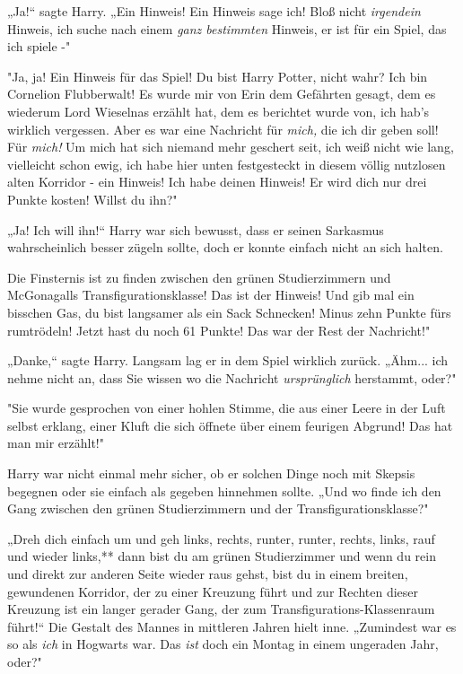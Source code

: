 {„Ja!“ sagte Harry. „Ein Hinweis! Ein Hinweis sage ich! Bloß nicht \emph{irgendein} Hinweis, ich suche nach einem \emph{ganz bestimmten} Hinweis, er ist für ein Spiel, das ich spiele -"

"Ja, ja! Ein Hinweis für das Spiel! Du bist Harry Potter, nicht wahr? Ich bin Cornelion Flubberwalt! Es wurde mir von Erin dem Gefährten gesagt, dem es wiederum Lord Wieselnas erzählt hat, dem es berichtet wurde von, ich hab's wirklich vergessen. Aber es war eine Nachricht für \emph{mich,} die ich dir geben soll! Für \emph{mich!} Um mich hat sich niemand mehr geschert seit, ich weiß nicht wie lang, vielleicht schon ewig, ich habe hier unten festgesteckt in diesem völlig nutzlosen alten Korridor - ein Hinweis! Ich habe deinen Hinweis! Er wird dich nur drei Punkte kosten! Willst du ihn?"

„Ja! Ich will ihn!“ Harry war sich bewusst, dass er seinen Sarkasmus wahrscheinlich besser zügeln sollte, doch er konnte einfach nicht an sich halten.

Die Finsternis ist zu finden zwischen den grünen Studierzimmern und McGonagalls Transfigurationsklasse! Das ist der Hinweis! Und gib mal ein bisschen Gas, du bist langsamer als ein Sack Schnecken! Minus zehn Punkte fürs rumtrödeln! Jetzt hast du noch 61 Punkte! Das war der Rest der Nachricht!"

„Danke,“ sagte Harry. Langsam lag er in dem Spiel wirklich zurück. „Ähm... ich nehme nicht an, dass Sie wissen wo die Nachricht \emph{ursprünglich} herstammt, oder?"

"Sie wurde gesprochen von einer hohlen Stimme, die aus einer Leere in der Luft selbst erklang, einer Kluft die sich öffnete über einem feurigen Abgrund! Das hat man mir erzählt!"

Harry war nicht einmal mehr sicher, ob er solchen Dinge noch mit Skepsis begegnen oder sie einfach als gegeben hinnehmen sollte. „Und wo finde ich den Gang zwischen den grünen Studierzimmern und der Transfigurationsklasse?"

„Dreh dich einfach um und geh links, rechts, runter, runter, rechts, links, rauf und wieder links,** dann bist du am grünen Studierzimmer und wenn du rein und direkt zur anderen Seite wieder raus gehst, bist du in einem breiten, gewundenen Korridor, der zu einer Kreuzung führt und zur Rechten dieser Kreuzung ist ein langer gerader Gang, der zum Transfigurations-Klassenraum führt!“ Die Gestalt des Mannes in mittleren Jahren hielt inne. „Zumindest war es so als \emph{ich} in Hogwarts war. Das \emph{ist} doch ein Montag in einem ungeraden Jahr, oder?"

}

